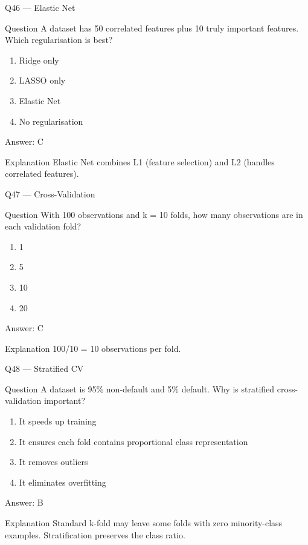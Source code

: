 \documentclass[aspectratio=169,8pt]{beamer}
\begin{document}
	\begin{frame}{Q46 --- Elastic Net}
		\begin{block}{Question}
			A dataset has 50 correlated features plus 10 truly important features. Which regularisation is best?
		\end{block}
		\begin{enumerate}
			\item Ridge only
			\item LASSO only
			\item Elastic Net
			\item No regularisation
		\end{enumerate}
		\begin{exampleblock}{Answer: C}\end{exampleblock}
		\begin{block}{Explanation}
			Elastic Net combines L1 (feature selection) and L2 (handles correlated features).
		\end{block}
	\end{frame}
	
	\begin{frame}{Q47 --- Cross-Validation}
		\begin{block}{Question}
			With 100 observations and k = 10 folds, how many observations are in each validation fold?
		\end{block}
		\begin{enumerate}
			\item 1
			\item 5
			\item 10
			\item 20
		\end{enumerate}
		\begin{exampleblock}{Answer: C}\end{exampleblock}
		\begin{block}{Explanation}
			100/10 = 10 observations per fold.
		\end{block}
	\end{frame}
	
	\begin{frame}{Q48 --- Stratified CV}
		\begin{block}{Question}
			A dataset is 95\% non-default and 5\% default. Why is stratified cross-validation important?
		\end{block}
		\begin{enumerate}
			\item It speeds up training
			\item It ensures each fold contains proportional class representation
			\item It removes outliers
			\item It eliminates overfitting
		\end{enumerate}
		\begin{exampleblock}{Answer: B}\end{exampleblock}
		\begin{block}{Explanation}
			Standard k-fold may leave some folds with zero minority-class examples. Stratification preserves the class ratio.
		\end{block}
	\end{frame}
	
\end{document}
